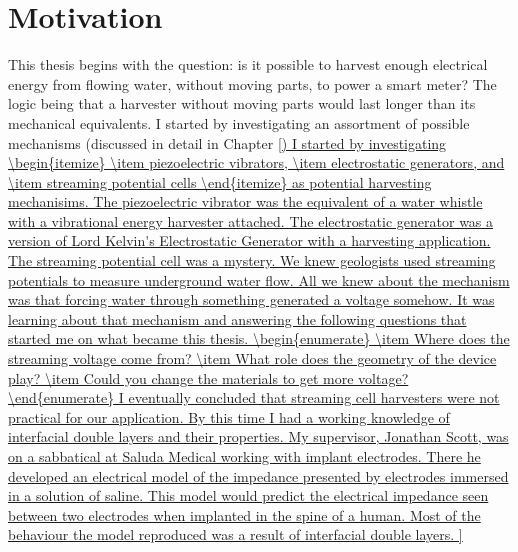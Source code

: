 
\section{Motivation}
This thesis begins with the question: is it possible to harvest enough electrical energy from flowing water, without moving parts, to power a smart meter?
The logic being that a harvester without moving parts would last longer than its mechanical equivalents.
I started by investigating an assortment of possible mechanisms (discussed in detail in Chapter \ref{)

I started by investigating
\begin{itemize}
\item piezoelectric vibrators,
\item electrostatic generators, and
\item streaming potential cells
\end{itemize}
as potential harvesting mechanisims.

The piezoelectric vibrator was the equivalent of a water whistle with a vibrational energy harvester attached.
The electrostatic generator was a version of Lord Kelvin's Electrostatic Generator with a harvesting application.
The streaming potential cell was a mystery.

We knew geologists used streaming potentials to measure underground water flow.
All we knew about the mechanism was that forcing water through something generated a voltage somehow.
It was learning about that mechanism and answering the following questions that started me on what became this thesis.
\begin{enumerate}
\item Where does the streaming voltage come from?
\item What role does the geometry of the device play?
\item Could you change the materials to get more voltage?
\end{enumerate}
I eventually concluded that streaming cell harvesters were not practical for our application.
By this time I had a working knowledge of interfacial double layers and their properties.

My supervisor, Jonathan Scott, was on a sabbatical at Saluda Medical working with implant electrodes.
There he developed an electrical model of the impedance presented by electrodes immersed in a solution of saline.
This model would predict the electrical impedance seen between two electrodes when implanted in the spine of a human.
Most of the behaviour the model reproduced was a result of interfacial double layers.

}
